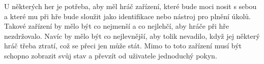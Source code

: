 U některých her je potřeba, aby měl hráč zařízení, které bude moci nosit s sebou a které mu při hře bude sloužit jako identifikace nebo nástroj pro plnění úkolů.
Takové zařízení by mělo být co nejmenší a co nejlehčí, aby hráče při hře nezdržovalo.
Navíc by mělo být co nejlevnější, aby tolik nevadilo, když jej některý hráč třeba ztratí, což se přeci jen může stát.
Mimo to toto zařízení musí být schopno zobrazit svůj stav a převzít od uživatele jednoduchý pokyn.




